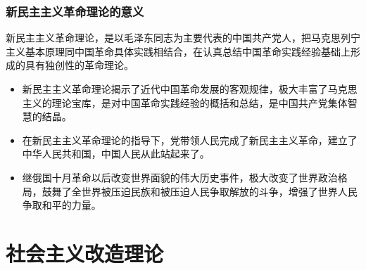 \documentclass[12pt,openany]{ctexbook}
\begin{document}
\subsection{新民主主义革命理论的意义}
新民主主义革命理论，是以毛泽东同志为主要代表的中国共产党人，把马克思列宁主义基本原理同中国革命具体实践相结合，在认真总结中国革命实践经验基础上形成的具有独创性的革命理论。
\begin{itemize}
  \item 新民主主义革命理论揭示了近代中国革命发展的客观规律，极大丰富了马克思主义的理论宝库，是对中国革命实践经验的概括和总结，是中国共产党集体智慧的结晶。
  \item 在新民主主义革命理论的指导下，党带领人民完成了新民主主义革命，建立了中华人民共和国，中国人民从此站起来了。
  \item 继俄国十月革命以后改变世界面貌的伟大历史事件，极大改变了世界政治格局，鼓舞了全世界被压迫民族和被压迫人民争取解放的斗争，增强了世界人民争取和平的力量。
\end{itemize}
\chapter{社会主义改造理论}
\end{document}
